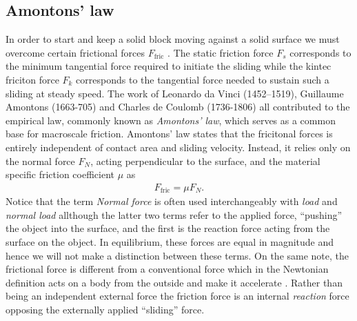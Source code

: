 \subsection{Amontons’ law}
 
 In order to start and keep a solid block moving against a solid surface we must
 overcome certain frictional forces $F_{\text{fric}}$ \cite{gnecco_meyer_2015}.
 The static friction force $F_s$ corresponds to the minimum tangential force
 required to initiate the sliding while the kintec friciton force $F_k$
 corresponds to the tangential force needed to sustain such a sliding at steady
 speed. The work of Leonardo da Vinci (1452–1519), Guillaume Amontons (1663-705)
 and Charles de Coulomb (1736-1806) all contributed to the empirical law,
 commonly known as \textit{Amontons’ law}, which serves as a common base for macroscale
 friction. Amontons’ law states that the fricitonal forces is entirely
 independent of contact area and sliding velocity. Instead, it relies only on
 the normal force $F_N$, acting perpendicular to the surface, and the material specific friction coefficient $\mu$ as
\begin{align}
  F_{\text{fric}} = \mu F_N.
  \label{eq:amonton}
\end{align}
Notice that the term \textit{Normal force} is often used interchangeably
with \textit{load} and \textit{normal load} allthough the latter two terms refer to the applied force, ``pushing'' the object into the surface, and the first is the reaction force acting from the surface on the object. In equilibrium, these forces are equal in magnitude and hence we will not make a distinction between these terms. On the same note, the frictional force is different from a conventional force which in the Newtonian definition acts on a body from the outside and make it accelerate \cite{gao_frictional_2004}. Rather than being an independent external force the friction force is an internal \textit{reaction} force opposing the externally applied ``sliding'' force. 

